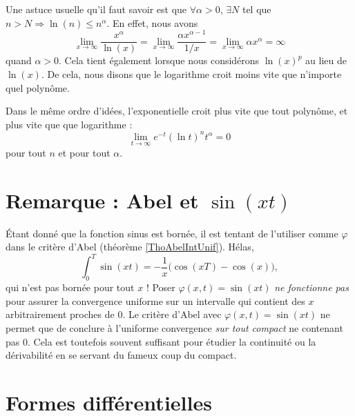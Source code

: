 Une astuce\label{PgAstuceLnPoly} usuelle qu'il faut savoir est que $\forall \alpha>0$, $\exists N$ tel que $n>N\Rightarrow \ln(n)\leq n^{\alpha}$. En effet, nous avons
\begin{equation}
    \lim_{x\to\infty} \frac{ x^{\alpha} }{ \ln(x) }=\lim_{x\to\infty} \frac{ \alpha x^{\alpha-1} }{ 1/x }=\lim_{x\to\infty} \alpha x^{\alpha}=\infty
\end{equation}
quand $\alpha>0$. Cela tient également lorsque nous considérons $\ln(x)^p$ au lieu de $\ln(x)$. De cela, nous disons que le logarithme croit moins vite que n'importe quel polynôme. 

Dans le même ordre d'idées, l'exponentielle croit plus vite que tout polynôme, et plus vite que que logarithme :
\begin{equation}        \label{EqExpDecrtPlusVite}
    \lim_{t\to\infty} e^{-t}(\ln t)^{n}t^{\alpha}=0
\end{equation}
pour tout $n$ et pour tout $\alpha$.

\section{Remarque : Abel et \texorpdfstring{$\sin(xt)$}{sin(xt)}}

Étant donné que la fonction sinus est bornée, il est tentant de l'utiliser comme $\varphi$ dans le critère d'Abel (théorème \ref{ThoAbelIntUnif}). Hélas,
\begin{equation}
    \int_0^T\sin(xt)=-\frac{ 1 }{ x }\big( \cos(xT)-\cos(x) \big),
\end{equation}
qui n'est pas bornée pour tout $x$ ! Poser $\varphi(x,t)=\sin(xt)$ \emph{ne fonctionne pas} pour assurer la convergence uniforme sur un intervalle qui contient des $x$ arbitrairement proches de $0$. Le critère d'Abel avec $\varphi(x,t)=\sin(xt)$ ne permet que de conclure à l'uniforme convergence \emph{sur tout compact} ne contenant pas $0$. Cela est toutefois souvent suffisant pour étudier la continuité ou la dérivabilité en se servant du fameux coup du compact.

                    \section{Formes différentielles}
\label{SecFormDiffRappel}

